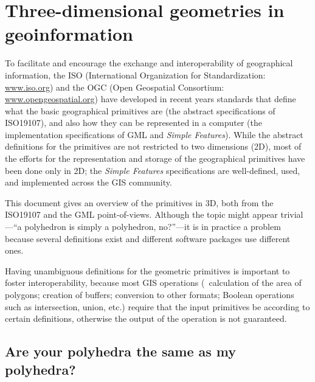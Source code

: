 
\setchapterpreamble[u]{\margintoc}

\graphicspath{{iso19107/}}

\chapter{Three-dimensional geometries in geoinformation}%
\label{chap:iso19107}

To facilitate and encourage the exchange and interoperability of geographical information, the ISO (International Organization for Standardization: \url{www.iso.org}) and the OGC (Open Geospatial Consortium: \url{www.opengeospatial.org}) have developed in recent years standards that define what the basic geographical primitives are (the abstract specifications of ISO19107), and also how they can be represented in a computer (the implementation specifications of GML and \emph{Simple Features}). 
While the abstract definitions for the primitives are not restricted to two dimensions (2D), most of the efforts for the representation and storage of the geographical primitives have been done only in 2D; the \emph{Simple Features} specifications are well-defined, used, and implemented across the GIS community.

This document gives an overview of the primitives in 3D, both from the ISO19107 and the GML point-of-views.
Although the topic might appear trivial---``a polyhedron is simply a polyhedron, no?''---it is in practice a problem because several definitions exist and different software packages use different ones.

Having unambiguous definitions for the geometric primitives is important to foster interoperability, because most GIS operations (\eg\ calculation of the area of polygons; creation of buffers; conversion to other formats; Boolean operations such as intersection, union, etc.) require that the input primitives be according to certain definitions, otherwise the output of the operation is not guaranteed.

%
\section[Same polyhedra?]{Are your polyhedra the same as my polyhedra?}%
\label{sec:definition}

